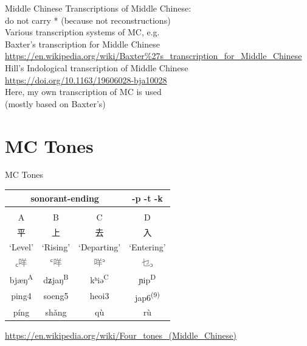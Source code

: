 \documentclass{beamer}
\begin{document}
\begin{frame}[fragile]{Middle Chinese}
Transcriptions of Middle Chinese:\\
do not carry * (because not reconstructions)\\
\medskip
Various transcription systems of MC, e.g.\\ 
Baxter's transcription for Middle Chinese\\
{\tiny \url{https://en.wikipedia.org/wiki/Baxter%27s_transcription_for_Middle_Chinese}}\\
Hill's Indological transcription of Middle Chinese\\
{\tiny \url{https://doi.org/10.1163/19606028-bja10028}}\\
\medskip
Here, my own transcription of MC is used\\ (mostly based on Baxter's)\\

\end{frame}

\section{MC Tones}
\begin{frame}[fragile]{MC Tones}

\begin{table}
\begin{tabular}{c|c|c||c}
    \hline
        \multicolumn{3}{c||}{sonorant-ending} & -p -t -k\\ \hline
         & & & \\
        A & B & C &D\\ 
        平 & 上 & 去 & 入\\
        \enquote*{Level} & \enquote*{Rising} & \enquote*{Departing} & \enquote*{Entering}\\
        ꜀\textcolor{gray}{咩} & ꜂\textcolor{gray}{咩} & \textcolor{gray}{咩}꜄ & \textcolor{gray}{乜}꜆ \\ \hline
        bjæŋ\textsuperscript{A} & dʑjaŋ\textsuperscript{B} & kʰiə\textsuperscript{C} & ɲip\textsuperscript{D}\\
        ping4 & soeng5 & heoi3 & jap6\textsuperscript{(9)}\\
        píng & shǎng & qù & rù\\ \hline
\end{tabular}
\end{table}
{\footnotesize \url{https://en.wikipedia.org/wiki/Four_tones_(Middle_Chinese)}}
\end{frame}
\end{document}
